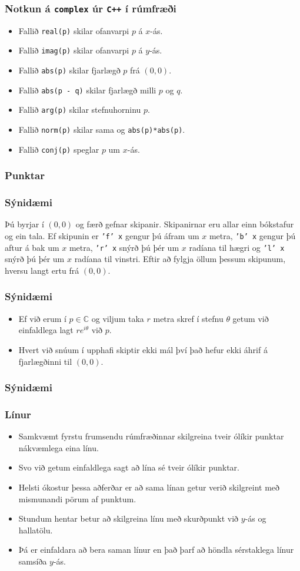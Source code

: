 \documentclass{beamer}
\newcommand\env[2]
{
	\begin{#1}
	#2
	\end{#1}
}
\newcommand\code[1]{\tiny}
\begin{document}
\env{frame}
{
	\frametitle{Notkun á \texttt{complex} úr \texttt{C++} í rúmfræði}
	\env{itemize}
	{
		\item<1-> Fallið \texttt{real(p)} skilar ofanvarpi $p$ á $x$-ás.
		\item<2-> Fallið \texttt{imag(p)} skilar ofanvarpi $p$ á $y$-ás.
		\item<3-> Fallið \texttt{abs(p)} skilar fjarlægð $p$ frá $(0, 0)$.
		\item<4-> Fallið \texttt{abs(p - q)} skilar fjarlægð milli $p$ og $q$.
		\item<5-> Fallið \texttt{arg(p)} skilar stefnuhorninu $p$.
		\item<6-> Fallið \texttt{norm(p)} skilar sama og \texttt{abs(p)*abs(p)}.
		\item<7-> Fallið \texttt{conj(p)} speglar $p$ um $x$-ás.
	}
}

\begin{frame}[fragile]
	\frametitle{Punktar}
	\code{point.h}
\end{frame}

\env{frame}
{
	\frametitle{Sýnidæmi}
	Þú byrjar í $(0, 0)$ og færð gefnar skipanir. Skipanirnar eru allar einn bókstafur og ein tala.
	Ef skipunin er \texttt{'f' x} gengur þú áfram um $x$ metra, \texttt{'b' x} gengur þú aftur á bak
	um $x$ metra, \texttt{'r' x} snýrð þú þér um $x$ radíana til hægri og \texttt{'l' x} snýrð þú
	þér um $x$ radíana til vinstri. Eftir að fylgja öllum þessum skipunum, hversu langt ertu frá
	$(0, 0)$.
}

\env{frame}
{
	\frametitle{Sýnidæmi}
	\env{itemize}
	{
		\item<1-> Ef við erum í $p \in \mathbb{C}$ og viljum taka $r$ metra skref í stefnu $\theta$ getum
			við einfaldlega lagt $re^{i\theta}$ við $p$.
		\item<2-> Hvert við snúum í upphafi skiptir ekki mál því það hefur ekki áhrif á fjarlægðinni til $(0, 0)$.
	}
}

\begin{frame}[fragile]
	\frametitle{Sýnidæmi}
	\code{kindalogo.cpp}
\end{frame}

\env{frame}
{
	\frametitle{Línur}
	\env{itemize}
	{
		\item<1-> Samkvæmt fyrstu frumsendu rúmfræðinnar skilgreina tveir ólíkir punktar nákvæmlega eina línu.
		\item<2-> Svo við getum einfaldlega sagt að lína sé tveir ólíkir punktar.
		\item<3-> Helsti ókostur þessa aðferðar er að sama línan getur verið skilgreint með mismunandi pörum af punktum.
		\item<4-> Stundum hentar betur að skilgreina línu með skurðpunkt við $y$-ás og hallatölu. 
		\item<5-> Þá er einfaldara að bera saman línur en það þarf að höndla sérstaklega línur samsíða $y$-ás.
	}
}
\end{document}
